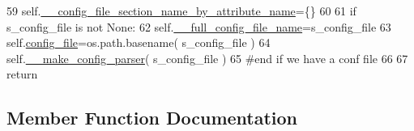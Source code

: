 \begin{DoxyCode}
59         self.\hyperlink{classnegui_1_1pginputsimupop_1_1PGInputSimuPop_acd9740f17e53a6e471d4e85565962369}{\_\_config\_file\_section\_name\_by\_attribute\_name}=\{\}
60 
61         \textcolor{keywordflow}{if} s\_config\_file \textcolor{keywordflow}{is} \textcolor{keywordflow}{not} \textcolor{keywordtype}{None}:
62             self.\hyperlink{classnegui_1_1pginputsimupop_1_1PGInputSimuPop_ad7c3feef55c16989a35f56c3e0d9943e}{\_\_full\_config\_file\_name}=s\_config\_file
63             self.\hyperlink{classnegui_1_1pginputsimupop_1_1PGInputSimuPop_af82bde7e564aee524fc30f2e06fde934}{config\_file}=os.path.basename( s\_config\_file )
64             self.\hyperlink{classnegui_1_1pginputsimupop_1_1PGInputSimuPop_a0b34c99730e86de268c5503ed226d15e}{\_\_make\_config\_parser}( s\_config\_file )
65         \textcolor{comment}{#end if we have a conf file}
66 
67         \textcolor{keywordflow}{return}
\end{DoxyCode}


\subsection{Member Function Documentation}
